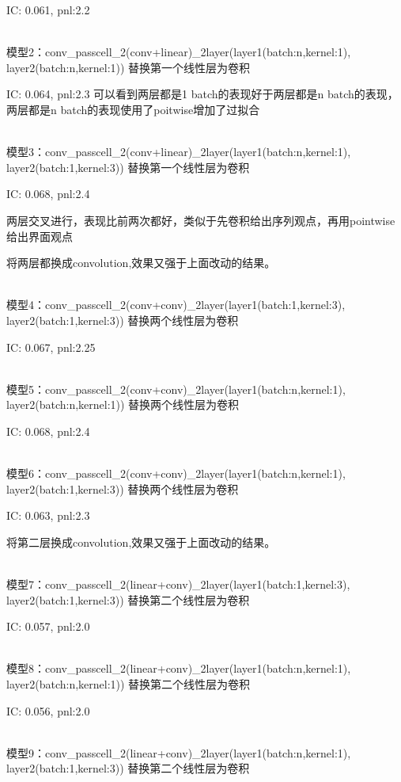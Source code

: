 \documentclass[11pt]{ctexart}
\begin{document}
{\kaishu \small IC: 0.061, pnl:2.2}

~\\
模型2：conv\_passcell\_2(conv+linear)\_2layer(layer1(batch:n,kernel:1), layer2(batch:n,kernel:1)) 替换第一个线性层为卷积

{\kaishu \small IC: 0.064, pnl:2.3}
可以看到两层都是1 batch的表现好于两层都是n batch的表现，两层都是n batch的表现使用了poitwise增加了过拟合

~\\
模型3：conv\_passcell\_2(conv+linear)\_2layer(layer1(batch:n,kernel:1), layer2(batch:1,kernel:3)) 替换第一个线性层为卷积

{\kaishu \small IC: 0.068, pnl:2.4}

两层交叉进行，表现比前两次都好，类似于先卷积给出序列观点，再用pointwise给出界面观点

将两层都换成convolution,效果又强于上面改动的结果。

~\\
模型4：conv\_passcell\_2(conv+conv)\_2layer(layer1(batch:1,kernel:3), layer2(batch:1,kernel:3)) 替换两个线性层为卷积

{\kaishu \small IC: 0.067, pnl:2.25}

~\\
模型5：conv\_passcell\_2(conv+conv)\_2layer(layer1(batch:n,kernel:1), layer2(batch:n,kernel:1)) 替换两个线性层为卷积

{\kaishu \small IC: 0.068, pnl:2.4}

~\\
模型6：conv\_passcell\_2(conv+conv)\_2layer(layer1(batch:n,kernel:1), layer2(batch:1,kernel:3)) 替换两个线性层为卷积

{\kaishu \small IC: 0.063, pnl:2.3}

将第二层换成convolution,效果又强于上面改动的结果。

~\\
模型7：conv\_passcell\_2(linear+conv)\_2layer(layer1(batch:1,kernel:3), layer2(batch:1,kernel:3)) 替换第二个线性层为卷积

{\kaishu \small IC: 0.057, pnl:2.0}

~\\
模型8：conv\_passcell\_2(linear+conv)\_2layer(layer1(batch:n,kernel:1), layer2(batch:n,kernel:1)) 替换第二个线性层为卷积

{\kaishu \small IC: 0.056, pnl:2.0}

~\\
模型9：conv\_passcell\_2(linear+conv)\_2layer(layer1(batch:n,kernel:1), layer2(batch:1,kernel:3)) 替换第二个线性层为卷积
\end{document}
